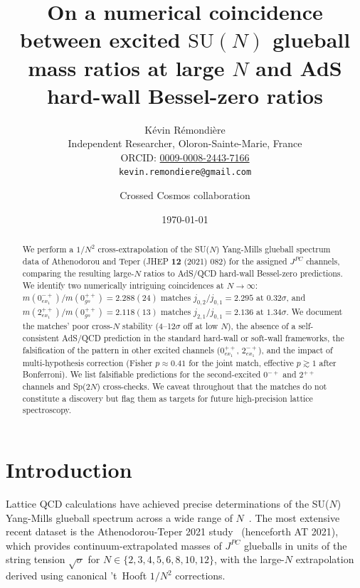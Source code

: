 \documentclass[reprint,prd,amsmath,amssymb,nofootinbib,superscriptaddress]{revtex4-2}
\newcommand{\jbz}[2]{j_{#1,#2}}      %
\begin{document}
\title{On a numerical coincidence between excited \texorpdfstring{$\mathrm{SU}(N)$}{SU(N)} glueball mass ratios at large \texorpdfstring{$N$}{N} and AdS hard-wall Bessel-zero ratios}

\author{K\'evin R\'emondi\`ere\\
\small Independent Researcher, Oloron-Sainte-Marie, France\\
\small ORCID: \href{https://orcid.org/0009-0008-2443-7166}{0009-0008-2443-7166}\\
\small \texttt{kevin.remondiere@gmail.com}}
\author{Crossed Cosmos collaboration}
\date{\today}

\begin{abstract}
We perform a $1/N^2$ cross-extrapolation of the SU($N$) Yang-Mills glueball spectrum data of Athenodorou and Teper (JHEP \textbf{12} (2021) 082) for the assigned $J^{PC}$ channels, comparing the resulting large-$N$ ratios to AdS/QCD hard-wall Bessel-zero predictions. We identify two numerically intriguing coincidences at $N \to \infty$: $m(0^{-+}_{ex_1})/m(0^{++}_{gs}) = 2.288(24)$ matches $\jbz{0}{2}/\jbz{0}{1} = 2.295$ at $0.32\sigma$, and $m(2^{++}_{ex_1})/m(0^{++}_{gs}) = 2.118(13)$ matches $\jbz{2}{1}/\jbz{0}{1} = 2.136$ at $1.34\sigma$. We document the matches' poor cross-$N$ stability (4--12$\sigma$ off at low $N$), the absence of a self-consistent AdS/QCD prediction in the standard hard-wall or soft-wall frameworks, the falsification of the pattern in other excited channels ($0^{++}_{ex_1}$, $2^{-+}_{ex_1}$), and the impact of multi-hypothesis correction (Fisher $p \approx 0.41$ for the joint match, effective $p \gtrsim 1$ after Bonferroni). We list falsifiable predictions for the second-excited 0$^{-+}$ and 2$^{++}$ channels and Sp($2N$) cross-checks. We caveat throughout that the matches do not constitute a discovery but flag them as targets for future high-precision lattice spectroscopy.
\end{abstract}

\maketitle

\section{Introduction}
\label{sec:intro}

Lattice QCD calculations have achieved precise determinations of the SU($N$) Yang-Mills glueball spectrum across a wide range of $N$~\cite{LuciniTeper2010, MorningstarPeardon1999, AthenodorouTeper2021}. The most extensive recent dataset is the Athenodorou-Teper 2021 study~\cite{AthenodorouTeper2021} (henceforth AT 2021), which provides continuum-extrapolated masses of $J^{PC}$ glueballs in units of the string tension $\sqrt{\sigma}$ for $N \in \{2, 3, 4, 5, 6, 8, 10, 12\}$, with the large-$N$ extrapolation derived using canonical 't~Hooft $1/N^2$ corrections.
\end{document}
